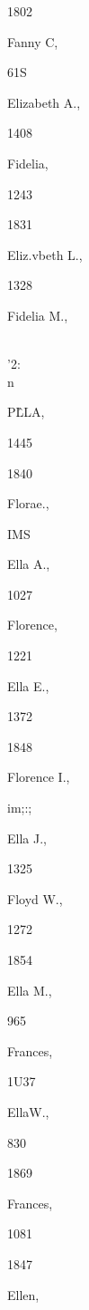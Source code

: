 1802 


Fanny C, 


61S 




Elizabeth A., 


1408 




Fidelia, 


1243 


1831 


Eliz.vbeth L., 


1328 




Fidelia M., 


\\'2:\\n 




P\^LLA, 


1445 


1840 


Florae., 


IMS 




Ella A., 


1027 




Florence, 


1221 




Ella E., 


1372 


1848 


Florence I., 


im;:; 




Ella J., 


1325 




Floyd W., 


1272 


1854 


Ella M., 


965 




Frances, 


1U37 




EllaW., 


830 


1869 


Frances, 


1081 


1847 


Ellen, 


